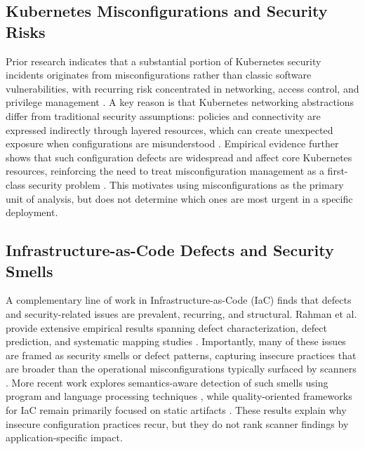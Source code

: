 \documentclass[12pt]{article}
\begin{document}
\subsection{Kubernetes Misconfigurations and Security Risks}
Prior research indicates that a substantial portion of Kubernetes security incidents originates from misconfigurations rather than classic software vulnerabilities, with recurring risk concentrated in networking, access control, and privilege management \cite{minna2021understanding,rahman2023security,shamim2020xi}. A key reason is that Kubernetes networking abstractions differ from traditional security assumptions: policies and connectivity are expressed indirectly through layered resources, which can create unexpected exposure when configurations are misunderstood \cite{minna2021understanding}. Empirical evidence further shows that such configuration defects are widespread and affect core Kubernetes resources, reinforcing the need to treat misconfiguration management as a first-class security problem \cite{zhang2025configurationdefectskubernetes}. This motivates using misconfigurations as the primary unit of analysis, but does not determine which ones are most urgent in a specific deployment.

\subsection{Infrastructure-as-Code Defects and Security Smells}
A complementary line of work in Infrastructure-as-Code (IaC) finds that defects and security-related issues are prevalent, recurring, and structural. Rahman et al. provide extensive empirical results spanning defect characterization, defect prediction, and systematic mapping studies \cite{rahman2018characteristics,rahman2018defect,rahman2019systematic}. Importantly, many of these issues are framed as security smells or defect patterns, capturing insecure practices that are broader than the operational misconfigurations typically surfaced by scanners \cite{rahman2019seven,rahman2020gang}. More recent work explores semantics-aware detection of such smells using program and language processing techniques \cite{war2025detection}, while quality-oriented frameworks for IaC remain primarily focused on static artifacts \cite{konala2025framework}. These results explain why insecure configuration practices recur, but they do not rank scanner findings by application-specific impact.
\end{document}
